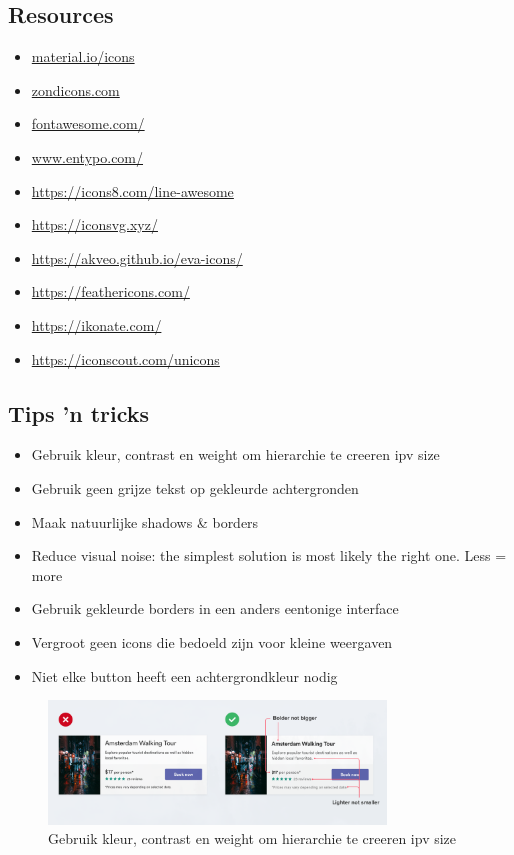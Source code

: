 \documentclass{article}
\begin{document}
\subsection{Resources}
\begin{itemize}
    \item \url{material.io/icons}
    \item \url{zondicons.com}
    \item \url{fontawesome.com/}
    \item \url{www.entypo.com/}
    \item \url{https://icons8.com/line-awesome}
    \item \url{https://iconsvg.xyz/}
    \item \url{https://akveo.github.io/eva-icons/}
    \item \url{https://feathericons.com/}
    \item \url{https://ikonate.com/}
    \item \url{https://iconscout.com/unicons}
\end{itemize}

\subsection{Tips 'n tricks}
\begin{itemize}
    \item Gebruik kleur, contrast en weight om hierarchie te creeren ipv size
    \item Gebruik geen grijze tekst op gekleurde achtergronden
    \item Maak natuurlijke shadows \& borders
    \item Reduce visual noise: the simplest solution is most likely the right one. Less = more
    \item Gebruik gekleurde borders in een anders eentonige interface
    \item Vergroot geen icons die bedoeld zijn voor kleine weergaven
    \item Niet elke button heeft een achtergrondkleur nodig
\end{itemize}

\begin{figure}[H]
    \centering
    \includegraphics[width=0.8\textwidth]{img/Screenshot_20200302_092000.png}
    \caption{Gebruik kleur, contrast en weight om hierarchie te creeren ipv size}
\end{figure}
\end{document}
